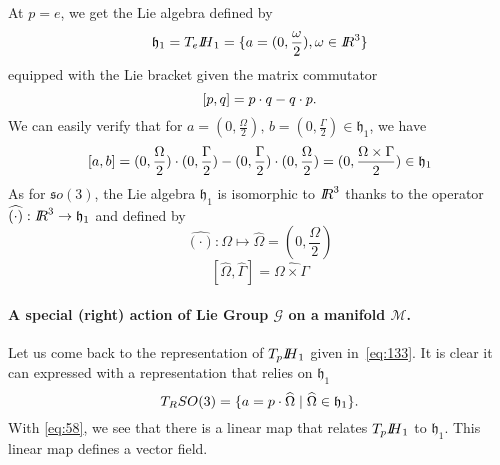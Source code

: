 At $p=e$, we get the Lie algebra defined by
\begin{equation}
  \label{eq:134}
  \mathfrak h_1 =  T_e{\mbox{\rm $I\!\!H$}_1} =  \{ a = (0, \frac \omega 2 ), \omega \in \mbox{\rm $I\!\!R$}^3 \}
\end{equation}
equipped with the Lie bracket given the matrix commutator
\begin{equation}
  \label{eq:135}
  [p,q] = p \cdot q- q\cdot p.
\end{equation}
We can easily verify that for $a = (0, \frac \Omega 2 ), \, b = (0, \frac \Gamma 2 ) \in \mathfrak h_1 $, we have
\begin{equation}
  \label{eq:136}
  [a,b] = (0, \frac \Omega 2 ) \cdot (0, \frac \Gamma 2 ) - (0, \frac \Gamma 2 ) \cdot  (0, \frac \Omega 2 )  = (0, \frac{\Omega\times \Gamma}{2}) \in \mathfrak h_1
\end{equation}
As for $\mathfrak so(3)$,  the Lie algebra $\mathfrak h_1$ is isomorphic to $\mbox{\rm $I\!\!R$}^3$ thanks to the operator $\widehat{(\cdot)} :\mbox{\rm $I\!\!R$}^3 \rightarrow \mathfrak h_1$ and defined by
\begin{equation}
  \label{eq:54}
 \widehat{(\cdot)}: \Omega \mapsto \widehat \Omega = (0, \frac \Omega 2 ) 
\end{equation}
\begin{equation}
  \label{eq:137}
  [\widehat{\Omega},\widehat{\Gamma}] = \widehat{\Omega \times \Gamma} 
\end{equation}


\paragraph{ A special  (right)  action of Lie Group $\mathcal G$ on a manifold $\mathcal M$. } 
Let us come back to the representation of  $T_p\mbox{\rm $I\!\!H$}_1$ given in~\eqref{eq:133}. It is clear it can expressed with a representation that relies on $\mathfrak h_1$
\begin{equation}
  \label{eq:158}
   T_RSO(3) = \{ a = p \cdot  \widehat \Omega \mid \widehat \Omega \in \mathfrak h_1 \}.
\end{equation}
With \eqref{eq:58}, we see that there is a linear map that relates $T_p\mbox{\rm $I\!\!H$}_1$ to  $\mathfrak h_1$. This linear map defines a vector field. 


